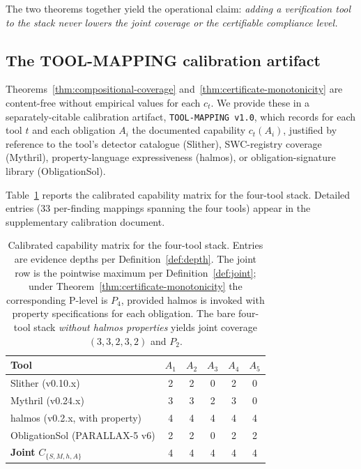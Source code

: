 \documentclass[11pt,a4paper]{article}
\begin{document}
\noindent The two theorems together yield the operational claim: \emph{adding a verification tool to the stack never lowers the joint coverage or the certifiable compliance level.}

\subsection{The TOOL-MAPPING calibration artifact}

Theorems~\ref{thm:compositional-coverage} and~\ref{thm:certificate-monotonicity} are content-free without empirical values for each $c_t$. We provide these in a separately-citable calibration artifact, \texttt{TOOL-MAPPING v1.0}, which records for each tool $t$ and each obligation $A_i$ the documented capability $c_t(A_i)$, justified by reference to the tool's detector catalogue (Slither), SWC-registry coverage (Mythril), property-language expressiveness (halmos), or obligation-signature library (ObligationSol).

Table~\ref{tab:capability-matrix} reports the calibrated capability matrix for the four-tool stack. Detailed entries (33 per-finding mappings spanning the four tools) appear in the supplementary calibration document.

\begin{table}[h]
\centering
\small
\begin{tabular}{lccccc}
\toprule
Tool & $A_1$ & $A_2$ & $A_3$ & $A_4$ & $A_5$ \\
\midrule
Slither (v0.10.x)    & 2 & 2 & 0 & 2 & 0 \\
Mythril (v0.24.x)    & 3 & 3 & 2 & 3 & 0 \\
halmos (v0.2.x, with property)   & 4 & 4 & 4 & 4 & 4 \\
ObligationSol (PARALLAX-5 v6)         & 2 & 2 & 0 & 2 & 2 \\
\midrule
\textbf{Joint} $C_{\{S, M, h, A\}}$ & 4 & 4 & 4 & 4 & 4 \\
\bottomrule
\end{tabular}
\caption{Calibrated capability matrix for the four-tool stack. Entries are evidence depths per Definition~\ref{def:depth}. The joint row is the pointwise maximum per Definition~\ref{def:joint}; under Theorem~\ref{thm:certificate-monotonicity} the corresponding P-level is $P_4$, provided halmos is invoked with property specifications for each obligation. The bare four-tool stack \emph{without halmos properties} yields joint coverage $(3, 3, 2, 3, 2)$ and $P_2$.}\label{tab:capability-matrix}
\end{table}
\end{document}
